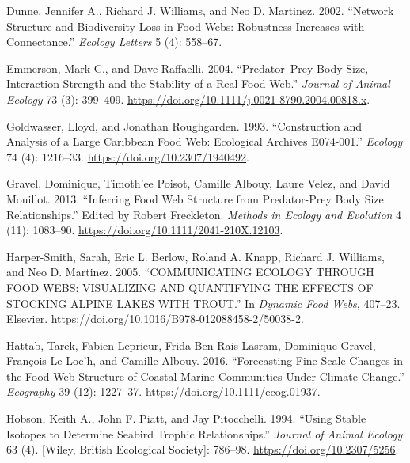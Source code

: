 \documentclass{article}
\begin{document}
\leavevmode\hypertarget{ref-dunneNetworkStructureBiodiversity}{}%
Dunne, Jennifer A., Richard J. Williams, and Neo D. Martinez. 2002.
``Network Structure and Biodiversity Loss in Food Webs: Robustness
Increases with Connectance.'' \emph{Ecology Letters} 5 (4): 558--67.

\leavevmode\hypertarget{ref-emmersonPredatorPreyBody2004}{}%
Emmerson, Mark C., and Dave Raffaelli. 2004. ``Predator--Prey Body Size,
Interaction Strength and the Stability of a Real Food Web.''
\emph{Journal of Animal Ecology} 73 (3): 399--409.
\url{https://doi.org/10.1111/j.0021-8790.2004.00818.x}.

\leavevmode\hypertarget{ref-goldwasserConstructionAnalysisLarge1993}{}%
Goldwasser, Lloyd, and Jonathan Roughgarden. 1993. ``Construction and
Analysis of a Large Caribbean Food Web: Ecological Archives E074-001.''
\emph{Ecology} 74 (4): 1216--33. \url{https://doi.org/10.2307/1940492}.

\leavevmode\hypertarget{ref-gravelInferringFoodWeb2013}{}%
Gravel, Dominique, Timoth\a'ee Poisot, Camille Albouy, Laure Velez, and
David Mouillot. 2013. ``Inferring Food Web Structure from Predator-Prey
Body Size Relationships.'' Edited by Robert Freckleton. \emph{Methods in
Ecology and Evolution} 4 (11): 1083--90.
\url{https://doi.org/10.1111/2041-210X.12103}.

\leavevmode\hypertarget{ref-harper-smithCOMMUNICATINGECOLOGYFOOD2005}{}%
Harper-Smith, Sarah, Eric L. Berlow, Roland A. Knapp, Richard J.
Williams, and Neo D. Martinez. 2005. ``COMMUNICATING ECOLOGY THROUGH
FOOD WEBS: VISUALIZING AND QUANTIFYING THE EFFECTS OF STOCKING ALPINE
LAKES WITH TROUT.'' In \emph{Dynamic Food Webs}, 407--23. Elsevier.
\url{https://doi.org/10.1016/B978-012088458-2/50038-2}.

\leavevmode\hypertarget{ref-hattabForecastingFinescaleChanges2016}{}%
Hattab, Tarek, Fabien Leprieur, Frida Ben Rais Lasram, Dominique Gravel,
François Le Loc'h, and Camille Albouy. 2016. ``Forecasting Fine-Scale
Changes in the Food-Web Structure of Coastal Marine Communities Under
Climate Change.'' \emph{Ecography} 39 (12): 1227--37.
\url{https://doi.org/10.1111/ecog.01937}.

\leavevmode\hypertarget{ref-hobsonUsingStableIsotopes1994}{}%
Hobson, Keith A., John F. Piatt, and Jay Pitocchelli. 1994. ``Using
Stable Isotopes to Determine Seabird Trophic Relationships.''
\emph{Journal of Animal Ecology} 63 (4). {[}Wiley, British Ecological
Society{]}: 786--98. \url{https://doi.org/10.2307/5256}.
\end{document}
